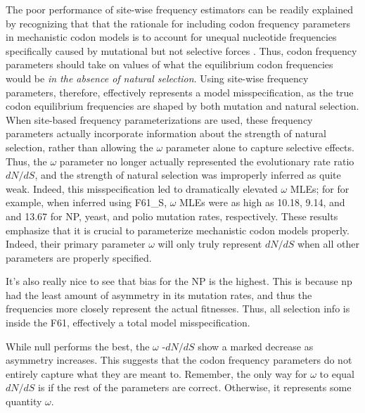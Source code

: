 \documentclass[11pt]{article}
\begin{document}
The poor performance of site-wise frequency estimators can be readily explained by recognizing that that the rationale for including codon frequency parameters in mechanistic codon models is to account for unequal nucleotide frequencies specifically caused by mutational but not selective forces \cite{YN00, Yang2006}. Thus, codon frequency parameters should take on values of what the equilibrium codon frequencies would be \textit{in the absence of natural selection}. Using site-wise frequency parameters, therefore, effectively represents a model misspecification, as the true codon equilibrium frequencies are shaped by both mutation and natural selection. When site-based frequency parameterizations are used, these frequency parameters actually incorporate information about the strength of natural selection, rather than allowing the $\omega$ parameter alone to capture selective effects. Thus, the $\omega$ parameter no longer actually represented the evolutionary rate ratio $dN/dS$, and the strength of natural selection was improperly inferred as quite weak. Indeed, this misspecification led to dramatically elevated $\omega$ MLEs; for for example, when inferred using F61\_S, $\omega$ MLEs were as high as 10.18, 9.14, and and 13.67 for NP, yeast, and polio mutation rates, respectively.  These results emphasize that it is crucial to parameterize mechanistic codon models properly. Indeed, their primary parameter $\omega$ will only truly represent $dN/dS$ when all other parameters are properly specified. 


It's also really nice to see that bias for the NP is the highest. This is because np had the least amount of asymmetry in its mutation rates, and thus the frequencies more closely represent the actual fitnesses. Thus, all selection info is inside the F61, effectively a total model misspecification.



While null performs the best, the $\omega$ -$dN/dS$ show a marked decrease as asymmetry increases. This suggests that the codon frequency parameters do not entirely capture what they are meant to. Remember, the only way for $\omega$ to equal $dN/dS$ is if the rest of the parameters are correct. Otherwise, it represents some quantity $\omega$. 
\end{document}
